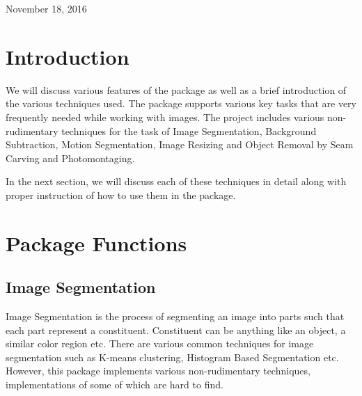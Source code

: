 \documentclass[12pt]{article}
\begin{document}
\begin{titlepage}


{\large November 18, 2016}\\[2cm] %



\vfill %

\end{titlepage}


\section{Introduction}

We will discuss various features of the package as well as a brief introduction of the various techniques used. The package supports various key tasks that are very frequently needed while working with images. The project includes various non-rudimentary techniques for the task of Image Segmentation, Background Subtraction, Motion Segmentation, Image Resizing and Object Removal by Seam Carving and Photomontaging.

In the next section, we will discuss each of these techniques in detail along with proper instruction of how to use them in the package.\\

\section{Package Functions}

\subsection{Image Segmentation}

Image Segmentation is the process of segmenting an image into parts such that each part represent a constituent. Constituent can be anything like an object, a similar color region etc. There are various common techniques for image segmentation such as K-means clustering, Histogram Based Segmentation etc. However, this package implements various non-rudimentary techniques, implementations of some of which are hard to find.\\
\end{document}
